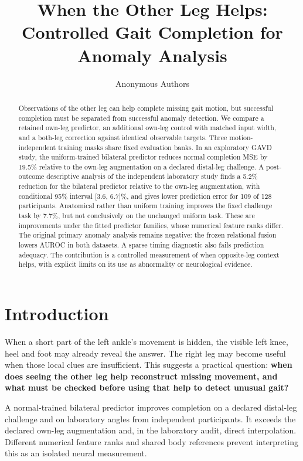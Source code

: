 \documentclass[letterpaper]{article}
\title{When the Other Leg Helps: Controlled Gait Completion for Anomaly Analysis}
\author{Anonymous Authors}
\begin{document}
\maketitle
\begin{abstract}
Observations of the other leg can help complete missing gait motion, but successful completion must be separated from successful anomaly detection. We compare a retained own-leg predictor, an additional own-leg control with matched input width, and a both-leg correction against identical observable targets. Three motion-independent training masks share fixed evaluation banks. In an exploratory GAVD study, the uniform-trained bilateral predictor reduces normal completion MSE by 19.5\% relative to the own-leg augmentation on a declared distal-leg challenge. A post-outcome descriptive analysis of the independent laboratory study finds a 5.2\% reduction for the bilateral predictor relative to the own-leg augmentation, with conditional 95\% interval {[}3.6, 6.7{]}\%, and gives lower prediction error for 109 of 128 participants. Anatomical rather than uniform training improves the fixed challenge task by 7.7\%, but not conclusively on the unchanged uniform task. These are improvements under the fitted predictor families, whose numerical feature ranks differ. The original primary anomaly analysis remains negative: the frozen relational fusion lowers AUROC in both datasets. A sparse timing diagnostic also fails prediction adequacy. The contribution is a controlled measurement of when opposite-leg context helps, with explicit limits on its use as abnormality or neurological evidence.
\end{abstract}
\section{Introduction}

When a short part of the left ankle's movement is hidden, the visible left knee, heel and foot may already reveal the answer. The right leg may become useful when those local clues are insufficient. This suggests a practical question: \textbf{when does seeing the other leg help reconstruct missing movement, and what must be checked before using that help to detect unusual gait?}

A normal-trained bilateral predictor improves completion on a declared distal-leg challenge and on laboratory angles from independent participants. It exceeds the declared own-leg augmentation and, in the laboratory audit, direct interpolation. Different numerical feature ranks and shared body references prevent interpreting this as an isolated neural measurement.
\end{document}
